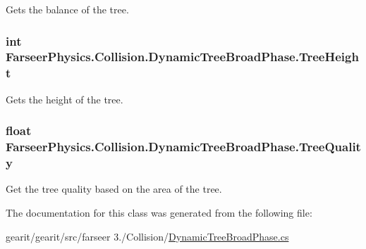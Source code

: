 Gets the balance of the tree. 

\hypertarget{class_farseer_physics_1_1_collision_1_1_dynamic_tree_broad_phase_a0f6cc4b6cb6b8919a986ffa2d0ae382d}{
\subsubsection[{Tree\+Height}]{\setlength{\rightskip}{0pt plus 5cm}int Farseer\+Physics.\+Collision.\+Dynamic\+Tree\+Broad\+Phase.\+Tree\+Height\hspace{0.3cm}{\ttfamily [get]}}}\label{class_farseer_physics_1_1_collision_1_1_dynamic_tree_broad_phase_a0f6cc4b6cb6b8919a986ffa2d0ae382d}


Gets the height of the tree. 

\hypertarget{class_farseer_physics_1_1_collision_1_1_dynamic_tree_broad_phase_a73c192ad114e8d962ccea45913a4edc5}{
\subsubsection[{Tree\+Quality}]{\setlength{\rightskip}{0pt plus 5cm}float Farseer\+Physics.\+Collision.\+Dynamic\+Tree\+Broad\+Phase.\+Tree\+Quality\hspace{0.3cm}{\ttfamily [get]}}}\label{class_farseer_physics_1_1_collision_1_1_dynamic_tree_broad_phase_a73c192ad114e8d962ccea45913a4edc5}


Get the tree quality based on the area of the tree. 



The documentation for this class was generated from the following file\+:\begin{DoxyCompactItemize}
\item 
gearit/gearit/src/farseer 3./\+Collision/\hyperlink{_dynamic_tree_broad_phase_8cs}{Dynamic\+Tree\+Broad\+Phase.\+cs}\end{DoxyCompactItemize}
